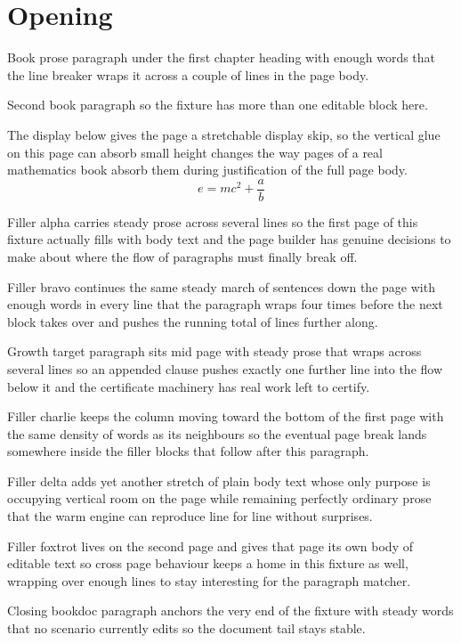 \documentclass{book}
\begin{document}
\chapter{Opening}

Book prose paragraph under the first chapter heading with enough words that the
line breaker wraps it across a couple of lines in the page body.

Second book paragraph so the fixture has more than one editable block here.

The display below gives the page a stretchable display skip, so the vertical
glue on this page can absorb small height changes the way pages of a real
mathematics book absorb them during justification of the full page body.
\begin{equation}
  e = m c^2 + \frac{a}{b}
\end{equation}

Filler alpha carries steady prose across several lines so the first page of
this fixture actually fills with body text and the page builder has genuine
decisions to make about where the flow of paragraphs must finally break off.

Filler bravo continues the same steady march of sentences down the page with
enough words in every line that the paragraph wraps four times before the
next block takes over and pushes the running total of lines further along.

Growth target paragraph sits mid page with steady prose that wraps across
several lines so an appended clause pushes exactly one further line into the
flow below it and the certificate machinery has real work left to certify.

Filler charlie keeps the column moving toward the bottom of the first page
with the same density of words as its neighbours so the eventual page break
lands somewhere inside the filler blocks that follow after this paragraph.

Filler delta adds yet another stretch of plain body text whose only purpose
is occupying vertical room on the page while remaining perfectly ordinary
prose that the warm engine can reproduce line for line without surprises.

Filler foxtrot lives on the second page and gives that page its own body of
editable text so cross page behaviour keeps a home in this fixture as well,
wrapping over enough lines to stay interesting for the paragraph matcher.

Closing bookdoc paragraph anchors the very end of the fixture with steady
words that no scenario currently edits so the document tail stays stable.
\end{document}
